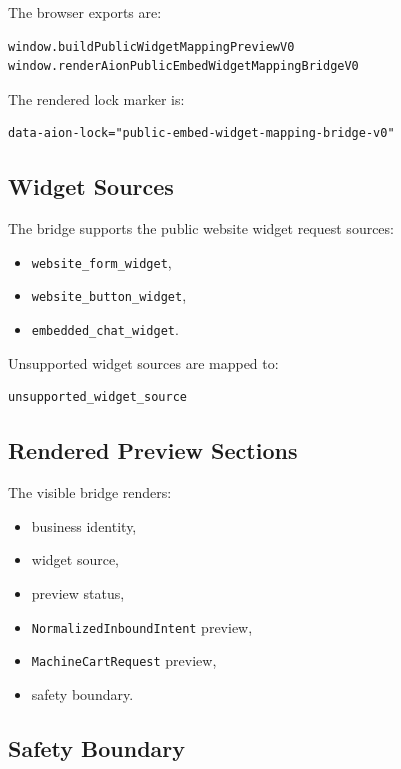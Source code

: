The browser exports are:

\begin{verbatim}
window.buildPublicWidgetMappingPreviewV0
window.renderAionPublicEmbedWidgetMappingBridgeV0
\end{verbatim}

The rendered lock marker is:

\begin{verbatim}
data-aion-lock="public-embed-widget-mapping-bridge-v0"
\end{verbatim}

\subsection{Widget Sources}

The bridge supports the public website widget request sources:

\begin{itemize}
  \item \texttt{website\_form\_widget},
  \item \texttt{website\_button\_widget},
  \item \texttt{embedded\_chat\_widget}.
\end{itemize}

Unsupported widget sources are mapped to:

\begin{verbatim}
unsupported_widget_source
\end{verbatim}

\subsection{Rendered Preview Sections}

The visible bridge renders:

\begin{itemize}
  \item business identity,
  \item widget source,
  \item preview status,
  \item \texttt{NormalizedInboundIntent} preview,
  \item \texttt{MachineCartRequest} preview,
  \item safety boundary.
\end{itemize}

\subsection{Safety Boundary}

